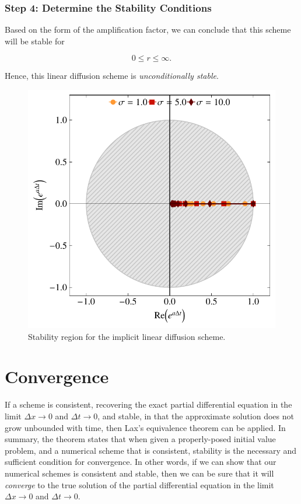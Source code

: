 \subsubsection{Step 4: Determine the Stability Conditions}
Based on the form of the amplification factor, we can conclude that this scheme will be stable for
\begin{eqBox}
\begin{equation}
	0 \leq r \leq \infty.
\end{equation}
\end{eqBox}
Hence, this linear diffusion scheme is {\it unconditionally stable}.
\begin{figure}[htbp]
	\centering
	\includegraphics[width=0.6\linewidth]{Pictures/ch12_implicit_diffusion}
	\caption{Stability region for the implicit linear diffusion scheme.}
	\label{fig:implicit_diffusion}
\end{figure}

\section{Convergence}
If a scheme is consistent, recovering the exact partial differential equation in the limit $\Delta x \rightarrow 0$ and $\Delta t \rightarrow 0$, and stable, in that the approximate solution does not grow unbounded with time, then Lax's equivalence theorem can be applied. In summary, the theorem states that when given a properly-posed initial value problem, and a numerical scheme that is consistent, stability is the necessary and sufficient condition for convergence. In other words, if we can show that our numerical schemes is consistent and stable, then we can be sure that it will {\it converge} to the true solution of the partial differential equation in the limit $\Delta x \rightarrow 0$ and $\Delta t \rightarrow 0$.

